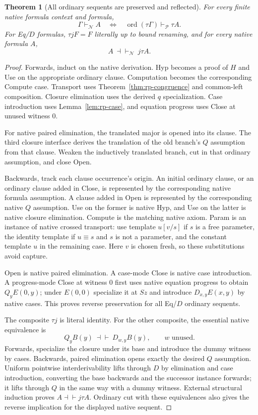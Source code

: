 \documentclass[11pt,letterpaper]{article}
\newtheorem{theorem}{Theorem}[section]
\begin{document}
\begin{theorem}[All ordinary sequents are preserved and reflected]
For every finite native formula context and formula,
\[
 \Gamma\vdash_{\mathcal N}A
 \quad\Longleftrightarrow\quad
 \operatorname{ord}(\tau\Gamma)\vdash_{\mathcal P}\tau A.
\]
For Eq/$D$ formulas, $\tau jF=F$ literally up to bound renaming, and
for every native formula $A$,
\[
 A\ \dashv\vdash_{\mathcal N}\ j\tau A.
\]
\end{theorem}
\begin{proof}
Forwards, induct on the native derivation.  Hyp becomes a proof of $H$
and Use on the appropriate ordinary clause.  Computation becomes the
corresponding Compute case.  Transport uses
Theorem~\ref{thm:rp-congruence} and common-left composition.
Closure elimination uses the derived $q$ specialization.  Case
introduction uses Lemma~\ref{lem:rp-case}, and equation progress uses
Close at unused witness $0$.

For native paired elimination, the translated major is opened into its
clause.  The third closure interface derives the translation of the old
branch's $Q$ assumption from that clause.  Weaken the inductively
translated branch, cut in that ordinary assumption, and close Open.

Backwards, track each clause occurrence's origin.  An initial ordinary
clause, or an ordinary clause added in Close, is represented by the
corresponding native formula assumption.  A clause added in Open is
represented by the corresponding native $Q$ assumption.  Use on the
former is native Hyp, and Use on the latter is native closure elimination.
Compute is the matching native axiom.  Param is an instance of native
crossed transport: use template $u[v/s]$ if $s$ is a free parameter,
the identity template if $u\equiv s$ and $s$ is not a parameter, and
the constant template $u$ in the remaining case.  Here $v$ is chosen
fresh, so these substitutions avoid capture.

Open is native paired elimination.  A case-mode Close is native case
introduction.  A progress-mode Close at witness $0$ first uses native
equation progress to obtain $Q_yE(0,y)$; under $E(0,0)$ specialize it at
$Sz$ and introduce $D_{x,y}E(x,y)$ by native cases.  This proves reverse
preservation for all Eq/$D$ ordinary sequents.

The composite $\tau j$ is literal identity.  For the other composite,
the essential native equivalence is
\[
 Q_yB(y)\ \dashv\vdash\ D_{w,y}B(y),\qquad w\text{ unused}.
\]
Forwards, specialize the closure under its base and introduce the dummy
witness by cases.  Backwards, paired elimination opens exactly the
desired $Q$ assumption.  Uniform pointwise interderivability lifts
through $D$ by elimination and case introduction, converting the base
backwards and the successor instance forwards; it lifts through $Q$
in the same way with a dummy witness.  External structural induction
proves $A\dashv\vdash j\tau A$.  Ordinary cut with these equivalences
also gives the reverse implication for the displayed native sequent.
\end{proof}
\end{document}

